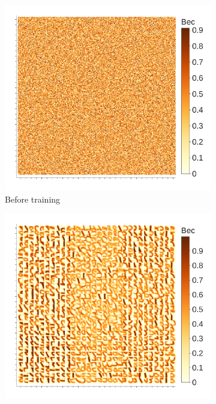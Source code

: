 \documentclass[a4paper]{article}
\begin{document}
\begin{figure}
\centering
\begin{subfigure}{0.45\textwidth}
    \includegraphics[width=\textwidth,keepaspectratio=true]{weights_XY_untrained_ru.pdf}
    \caption{Before training}
\end{subfigure}
\begin{subfigure}{0.45\textwidth}  \label{weights_XY}
    \includegraphics[width=\textwidth,keepaspectratio=true]{weights_XY_ru.pdf}

\end{subfigure}
\end{figure}
\end{document}

